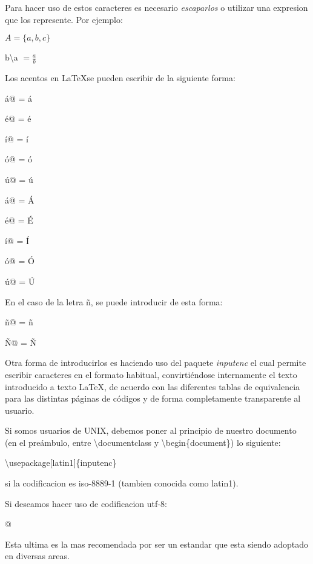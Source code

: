 \documentclass[letterpaper,11pt]{article}
\begin{document}
Para hacer uso de estos caracteres es necesario \textit{escaparlos} o utilizar una expresion que los represente. Por ejemplo:

$A = \{a, b, c\}$

b\textbackslash a $= \frac{a}{b}$



Los acentos en \LaTeX se pueden escribir de la siguiente forma:

\verb@\'a@ = \'a 

\verb@\'e@ = \'e

\verb@\'i@ = \'i

\verb@\'o@ = \'o

\verb@\'u@ = \'u

\verb@\'a@ = \'A

\verb@\'e@ = \'E

\verb@\'i@ = \'I

\verb@\'o@ = \'O

\verb@\'u@ = \'U

En el caso de la letra \~n, se puede introducir de esta forma:

\verb@\~n@ = \~n

\verb@\~N@ = \~N

\noindent Otra forma de introducirlos es haciendo uso del paquete \textit{inputenc} el cual 
permite escribir caracteres en el formato habitual, convirtiéndose internamente el texto 
introducido a texto LaTeX, de acuerdo con las diferentes tablas de equivalencia para las 
distintas páginas de códigos y de forma completamente transparente al usuario.

\noindent Si somos usuarios de UNIX, debemos poner al principio de nuestro documento 
(en el preámbulo, entre \textbackslash documentclass y \textbackslash begin\{document\}) lo siguiente:


\textbackslash usepackage[latin1]\{inputenc\}


si la codificacion es iso-8889-1 (tambien conocida como latin1).


Si deseamos hacer uso de codificacion utf-8:

\verb@\usepackage[utf8]{inputenc}@

\noindent Esta ultima es la mas recomendada por ser un estandar que esta siendo adoptado en diversas areas.

\end{document}

